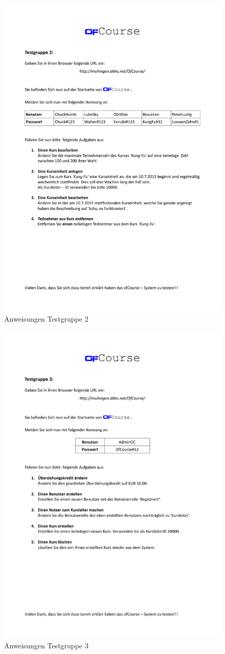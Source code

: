 \begin{figure}[h]
	\centering
	\includegraphics[width=0.9\linewidth, page=1]{pdf/AnweisungenTestgruppe2}		\caption{Anweisungen Testgruppe 2}
	\label{fig:Anweisungen2}
\end{figure}
\begin{figure}[h]
	\centering
	\includegraphics[width=0.9\linewidth, page=1]{pdf/AnweisungenTestgruppe3}
	\caption{Anweisungen Testgruppe 3}
	\label{fig:Anweisungen3}
\end{figure}